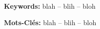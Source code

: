 
\begin{frontsection}[Abstract]

\vspace{\baselineskip}
\noindent\textbf{\large Keywords:} blah -- blih -- bloh
\vspace{\baselineskip}


\lipsum[1-10]


\end{frontsection}

\begin{frontsection}[Abstract]


\vspace{\baselineskip}

\noindent\textbf{\large Mots-Clés:} blah -- blih -- bloh

\vspace{\baselineskip}

\lipsum[1-10]

\end{frontsection}


